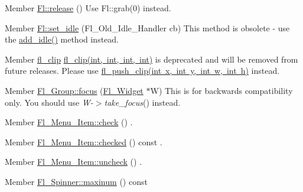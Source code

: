 
\begin{DoxyRefList}
\item[Member \mbox{\hyperlink{class_fl_a656023b0db49ae9b88e277ccdb27ce1b}{Fl::release}} ()]\label{deprecated__deprecated000003}%
%
Use Fl\+::grab(0) instead.  
\item[Member \mbox{\hyperlink{class_fl_a77955ad2f2b83fc5e3925b94e4533b20}{Fl::set\+\_\+idle}} (Fl\+\_\+\+Old\+\_\+\+Idle\+\_\+\+Handler cb)]\label{deprecated__deprecated000002}%
%
This method is obsolete -\/ use the \mbox{\hyperlink{class_fl_a42d6e5121c18ed1a422fbb02993cf900}{add\+\_\+idle()}} method instead.  
\item[Member \mbox{\hyperlink{group__fl__drawings_ga0061bafa4252431de247713975e4c3ef}{fl\+\_\+clip}} ]\label{deprecated__deprecated000004}%
%
 \mbox{\hyperlink{group__fl__drawings_ga0061bafa4252431de247713975e4c3ef}{fl\+\_\+clip(int, int, int, int)}} is deprecated and will be removed from future releases. Please use \mbox{\hyperlink{group__fl__drawings_gabe60242ba3b975800717b95cb6bc06d2}{fl\+\_\+push\+\_\+clip(int x, int y, int w, int h)}} instead.  
\item[Member \mbox{\hyperlink{class_fl___group_a53cdffb97187987a624c1b71cc38ad3a}{Fl\+\_\+\+Group::focus}} (\mbox{\hyperlink{class_fl___widget}{Fl\+\_\+\+Widget}} $\ast$W)]\label{deprecated__deprecated000005}%
%
This is for backwards compatibility only. You should use {\itshape W-\/$>$take\+\_\+focus}() instead.  
\item[Member \mbox{\hyperlink{struct_fl___menu___item_a7b762f887849570b33309537ce2d5fd4}{Fl\+\_\+\+Menu\+\_\+\+Item::check}} ()]\label{deprecated__deprecated000007}%
%
.  
\item[Member \mbox{\hyperlink{struct_fl___menu___item_a3ab5231b3f7785113ff57210b00f692a}{Fl\+\_\+\+Menu\+\_\+\+Item::checked}} () const]\label{deprecated__deprecated000006}%
%
.  
\item[Member \mbox{\hyperlink{struct_fl___menu___item_ae89657ebc69eebd87a0ed10a730ce941}{Fl\+\_\+\+Menu\+\_\+\+Item::uncheck}} ()]\label{deprecated__deprecated000008}%
%
.  
\item[Member \mbox{\hyperlink{class_fl___spinner_abee4b9eab726c7b88a946751118ae7d2}{Fl\+\_\+\+Spinner::maxinum}} () const]\label{deprecated__deprecated000009}%
%
  

\end{DoxyRefList}
